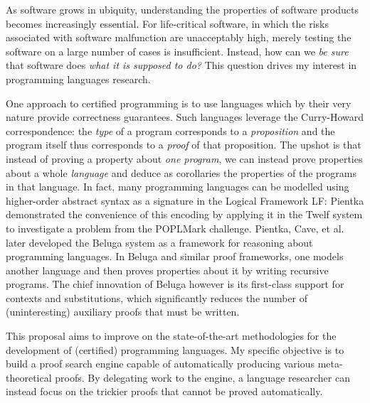 \documentclass[12pt,letterpaper]{article}
\begin{document}
As software grows in ubiquity, understanding the properties of software
products becomes increasingly essential. For life-critical software, in which
the risks associated with software malfunction are unacceptably high, merely
testing the software on a large number of cases is insufficient. Instead, how
can we \emph{be sure} that software does \emph{what it is supposed to do?}
This question drives my interest in programming languages research.

One approach to certified programming is to use languages which by their very
nature provide correctness guarantees. Such languages leverage the Curry-Howard
correspondence: the \emph{type} of a program corresponds to a
\emph{proposition} and the program itself thus corresponds to a \emph{proof} of
that proposition.
%
The upshot is that instead of proving a property about \emph{one program}, we
can instead prove properties about a whole \emph{language} and deduce as
corollaries the properties of the programs in that language.
%
In fact, many programming languages can be modelled using higher-order
abstract syntax\cite{hoas} as a signature in the Logical Framework LF\cite{lf}:
Pientka demonstrated\cite{bp-proof-pearl} the convenience of this encoding by
applying it in the Twelf\cite{twelf} system to investigate a problem from the
POPLMark challenge\cite{poplmark}.
Pientka, Cave, et al. later developed the
Beluga\cite{beluga,subst-beluga,inductive-beluga} system as a framework for
reasoning about programming languages.
In Beluga and similar proof frameworks, one models another language and then
proves properties about it by writing recursive programs.
The chief innovation of Beluga however is its first-class support for contexts
and substitutions, which significantly reduces the number of (uninteresting)
auxiliary proofs that must be written.

This proposal aims to improve on the state-of-the-art methodologies for the
development of (certified) programming languages.
My specific objective is to build a proof search engine capable of
automatically producing various meta-theoretical proofs.
By delegating work to the engine, a language researcher can instead focus on
the trickier proofs that cannot be proved automatically.
\end{document}
